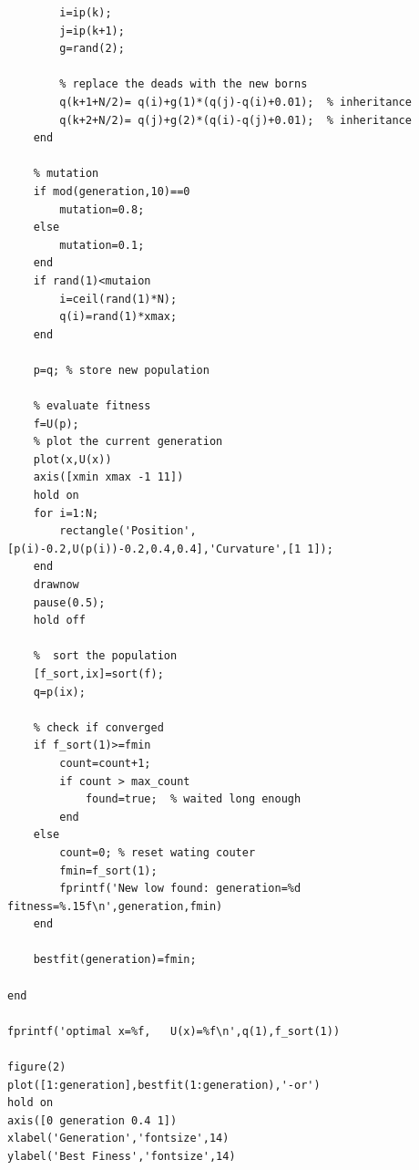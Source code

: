 \begin{verbatim}
        i=ip(k);
        j=ip(k+1);
        g=rand(2);
       
        % replace the deads with the new borns
        q(k+1+N/2)= q(i)+g(1)*(q(j)-q(i)+0.01);  % inheritance
        q(k+2+N/2)= q(j)+g(2)*(q(i)-q(j)+0.01);  % inheritance
    end
    
    % mutation
    if mod(generation,10)==0
        mutation=0.8;
    else
        mutation=0.1;
    end
    if rand(1)<mutaion
        i=ceil(rand(1)*N);
        q(i)=rand(1)*xmax;
    end
    
    p=q; % store new population
    
    % evaluate fitness
    f=U(p);
    % plot the current generation
    plot(x,U(x))
    axis([xmin xmax -1 11])
    hold on
    for i=1:N;
        rectangle('Position',[p(i)-0.2,U(p(i))-0.2,0.4,0.4],'Curvature',[1 1]);
    end
    drawnow
    pause(0.5);
    hold off

    %  sort the population
    [f_sort,ix]=sort(f);
    q=p(ix);
    
    % check if converged
    if f_sort(1)>=fmin
        count=count+1;
        if count > max_count
            found=true;  % waited long enough
        end
    else
        count=0; % reset wating couter
        fmin=f_sort(1);
        fprintf('New low found: generation=%d fitness=%.15f\n',generation,fmin)
    end
    
    bestfit(generation)=fmin;

end

fprintf('optimal x=%f,   U(x)=%f\n',q(1),f_sort(1))

figure(2)
plot([1:generation],bestfit(1:generation),'-or')
hold on
axis([0 generation 0.4 1]) 
xlabel('Generation','fontsize',14)
ylabel('Best Finess','fontsize',14)
\end{verbatim}
\normalsize


